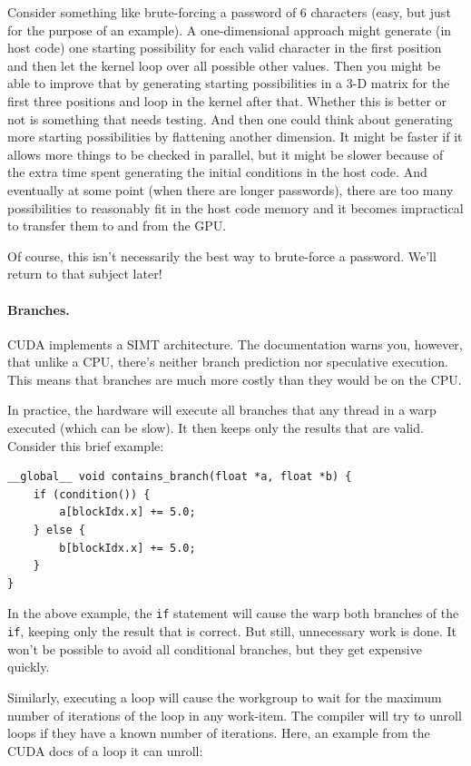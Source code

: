 Consider something like brute-forcing a password of 6 characters (easy, but just for the purpose of an example). A one-dimensional approach might generate (in host code) one starting possibility for each valid character in the first position and then let the kernel loop over all possible other values. Then you might be able to improve that by generating starting possibilities in a 3-D matrix for the first three positions and loop in the kernel after that. Whether this is better or not is something that needs testing. And then one could think about generating more starting possibilities by flattening another dimension. It might be faster if it allows more things to be checked in parallel, but it might be slower because of the extra time spent generating the initial conditions in the host code. And eventually at some point (when there are longer passwords), there are too many possibilities to reasonably fit in the host code memory and it becomes impractical to transfer them to and from the GPU.

Of course, this isn't necessarily the best way to brute-force a password. We'll return to that subject later!

\paragraph{Branches.} CUDA implements a SIMT architecture. The documentation warns you, however, that unlike a CPU, there's neither branch prediction nor speculative execution. This means that branches are much more costly than they would be on the CPU. 

In practice, the hardware will execute all branches that any thread in
a warp executed (which can be slow). It then keeps only the results that are valid. Consider this brief example:

    \begin{verbatim}
__global__ void contains_branch(float *a, float *b) {
    if (condition()) {
        a[blockIdx.x] += 5.0;
    } else {
        b[blockIdx.x] += 5.0;
    }
}
\end{verbatim}

In the above example, the {\tt if} statement will cause
the warp both branches of the {\tt if}, keeping only the
result that is correct. But still, unnecessary work is done. It won't be possible to avoid all conditional branches, but they get expensive quickly.

Similarly, executing a loop will cause the
workgroup to wait for the maximum number of iterations of the loop in
any work-item. The compiler will try to unroll loops if they have a known number of iterations. Here, an example from the CUDA docs of a loop it can unroll:

